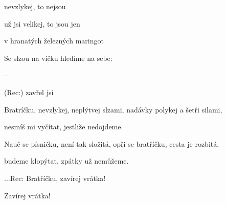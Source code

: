 

\zs
{} nevzlykej, to nejsou 

 už jsi velikej, to jsou jen 

 v hranatých železných maringot

Se slzou na víčku hledíme na sebe:

\ks

\zr
{}      

     

   --

 (Rec:) zavřel jsi 
\kr

\zs
Bratríčku, nevzlykej, neplýtvej slzami, nadávky polykej a šetři silami,

nesmíš mi vyčítat, jestliže nedojdeme.

Nauč se písničku, není tak složitá, opři se bratříčku, cesta je rozbitá,

budeme klopýtat, zpátky už nemůžeme.
\ks

\zr
...Rec: Bratříčku, zavírej vrátka!

Zavírej vrátka!
\kr

\kp
